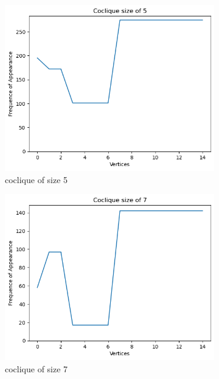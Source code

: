 \documentclass{amsart}
\theoremstyle{definition}
\begin{document}
\begin{appendix}
\begin{figure}[hbt!]
\begin{subfigure}[b]{.45\textwidth}
		\centering
		\includegraphics[width=1\linewidth]{depth_4_size_5.png}
		\caption{coclique of size 5}
	\end{subfigure}
	\begin{subfigure}[b]{.45\textwidth}
		\centering
		\includegraphics[width=1\linewidth]{depth_4_size_7.png}
		\caption{coclique of size 7}
	\end{subfigure}
	\begin{subfigure}[b]{.45\textwidth}
		\centering

\end{subfigure}
\end{figure}
\end{appendix}
\end{document}
